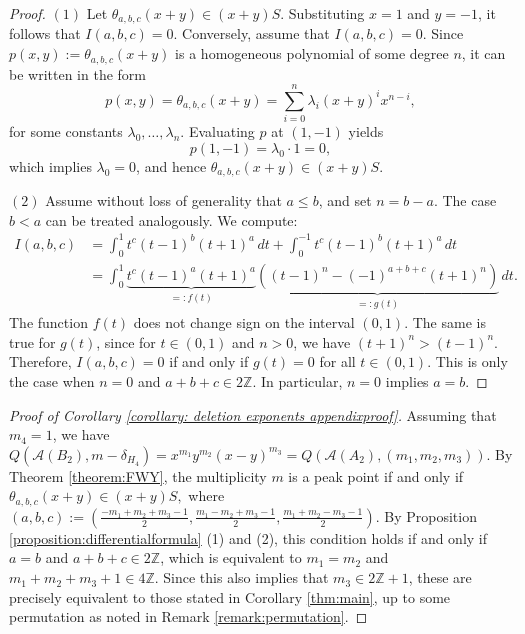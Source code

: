 \documentclass[12pt]{amsart}
\theoremstyle{definition}
\theoremstyle{remark}
\newcommand\CA{{\mathscr A}}
\newcommand\ZZ{{\mathbb Z}}
\begin{document}
\begin{proof}
$(1)$ Let $\theta_{a,b,c}(x+y) \in (x+y)S$. Substituting $x = 1$ and $y = -1$, it follows that $I(a,b,c) = 0$. Conversely, assume that $I(a,b,c) = 0$. Since $p(x,y) := \theta_{a,b,c}(x + y)$ is a homogeneous polynomial of some degree $n$, it can be written in the form
    $$
    p(x, y) = \theta_{a,b,c}(x + y) = \sum_{i=0}^{n} \lambda_i (x + y)^i x^{n-i},
    $$
    for some constants $\lambda_0, \ldots, \lambda_n$. Evaluating $p$ at $(1, -1)$ yields
    $$
    p(1, -1) = \lambda_0 \cdot 1 = 0,
    $$
    which implies $\lambda_0 = 0$, and hence $\theta_{a,b,c}(x + y) \in (x + y)S$.

    $(2)$ Assume without loss of generality that $a \leq b$, and set $n = b - a$. The case $b < a$ can be treated analogously. We compute:
    \begin{align*}
    I(a,b,c)
    &= \int_{0}^{1} t^c (t - 1)^b (t + 1)^a \, dt + \int_{0}^{-1} t^c (t - 1)^b (t + 1)^a \, dt \\
    &= \int_{0}^{1} 
    \underbrace{t^c (t - 1)^a (t + 1)^a}_{=: f(t)}
    \underbrace{\left((t - 1)^n - (-1)^{a + b + c} (t + 1)^n \right)}_{=: g(t)} \, dt.
    \end{align*}
    The function $f(t)$ does not change sign on the interval $(0,1)$. The same is true for $g(t)$, since for $t \in (0,1)$ and $n > 0$, we have $(t + 1)^n > (t - 1)^n$. Therefore, $I(a,b,c) = 0$ if and only if $g(t) = 0$ for all $t \in (0,1)$. This is only the case when $n = 0$ and $a + b + c \in 2\mathbb{Z}$. In particular, $n = 0$ implies $a = b$.
\end{proof}

\begin{proof}[Proof of Corollary \ref{corollary: deletion exponents appendixproof}]
    Assuming that $m_4=1$, we have 
    $Q(\CA(B_2),m-\delta_{H_4})={x}^{m_1}{y}^{m_2}(x-y)^{m_3}=Q(\CA(A_2),(m_1,m_2,m_3))$. By Theorem \ref{theorem:FWY}, the multiplicity $m$ is a peak point if and only if 
        $\theta_{a,b,c}(x+y)\in(x+y)S,$ where $(a,b,c):=(\frac{-m_1+m_2+m_3-1}{2},\frac{m_1-m_2+m_3-1}{2},\frac{m_1+m_2-m_3-1}{2})$.
        By Proposition \ref{proposition:differentialformula} (1) and (2), this  condition holds if and only if 
        $a=b$ and $a+b+c\in2\ZZ$, which is equivalent to 
        $m_1=m_2$ and $m_1+m_2+m_3+1\in4\ZZ$. Since this also implies that $m_3\in2\ZZ+1$, these are precisely equivalent to those stated in Corollary \ref{thm:main}, up to some permutation as noted in Remark \ref{remark:permutation}.  
\end{proof}
\end{document}
